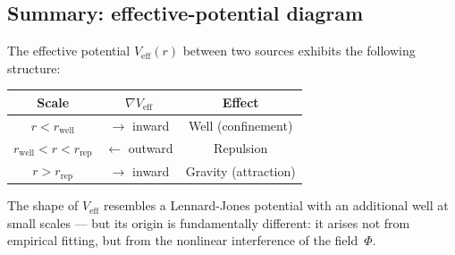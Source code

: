 \subsection{Summary: effective-potential diagram}\label{ssec:diagram}

The effective potential $V_{\mathrm{eff}}(r)$ between two sources
exhibits the following structure:

\begin{center}
\begin{tabular}{ccc}
\toprule
\textbf{Scale} & $\nabla V_{\mathrm{eff}}$ & \textbf{Effect} \\
\midrule
$r < r_{\mathrm{well}}$ & $\to$ inward & Well (confinement) \\
$r_{\mathrm{well}} < r < r_{\mathrm{rep}}$
  & $\leftarrow$ outward & Repulsion \\
$r > r_{\mathrm{rep}}$ & $\to$ inward & Gravity (attraction) \\
\bottomrule
\end{tabular}
\end{center}

The shape of $V_{\mathrm{eff}}$ resembles a Lennard-Jones potential
with an additional well at small scales --- but its origin is
fundamentally different: it arises not from empirical fitting, but
from the nonlinear interference of the field~$\Phi$.
